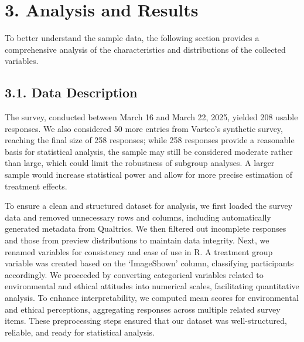 \documentclass[
]{article}
\begin{document}
\hypertarget{analysis-and-results}{%
\section{3. Analysis and Results}\label{analysis-and-results}}

To better understand the sample data, the following section provides a
comprehensive analysis of the characteristics and distributions of the
collected variables.

\hypertarget{data-description}{%
\subsection{3.1. Data Description}\label{data-description}}

The survey, conducted between March 16 and March 22, 2025, yielded 208
usable responses. We also considered 50 more entries from Varteo's
synthetic survey, reaching the final size of 258 responses; while 258
responses provide a reasonable basis for statistical analysis, the
sample may still be considered moderate rather than large, which could
limit the robustness of subgroup analyses. A larger sample would
increase statistical power and allow for more precise estimation of
treatment effects.

To ensure a clean and structured dataset for analysis, we first loaded
the survey data and removed unnecessary rows and columns, including
automatically generated metadata from Qualtrics. We then filtered out
incomplete responses and those from preview distributions to maintain
data integrity. Next, we renamed variables for consistency and ease of
use in R. A treatment group variable was created based on the
`ImageShown' column, classifying participants accordingly. We proceeded
by converting categorical variables related to environmental and ethical
attitudes into numerical scales, facilitating quantitative analysis. To
enhance interpretability, we computed mean scores for environmental and
ethical perceptions, aggregating responses across multiple related
survey items. These preprocessing steps ensured that our dataset was
well-structured, reliable, and ready for statistical analysis.
\end{document}
